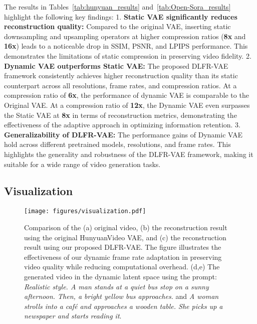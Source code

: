 The results in Tables~\ref{tab:hunyuan_results} and~\ref{tab:Open-Sora_results} highlight the following key findings: 1. \textbf{Static VAE significantly reduces reconstruction quality:} Compared to the original VAE, inserting static downsampling and upsampling operators at higher compression ratios (\textbf{8x} and \textbf{16x}) leads to a noticeable drop in SSIM, PSNR, and LPIPS performance. This demonstrates the limitations of static compression in preserving video fidelity. 2. \textbf{Dynamic VAE outperforms Static VAE:} The proposed DLFR-VAE framework consistently achieves higher reconstruction quality than its static counterpart across all resolutions, frame rates, and compression ratios. 
At a compression ratio of \textbf{6x}, the performance of dynamic VAE is comparable to the Original VAE. At a compression ratio of \textbf{12x}, the Dynamic VAE even surpasses the Static VAE at \textbf{8x} in terms of reconstruction metrics, demonstrating the effectiveness of the adaptive approach in optimizing information retention. 3. \textbf{Generalizability of DLFR-VAE:} The performance gains of Dynamic VAE hold across different pretrained models, resolutions, and frame rates. This highlights the generality and robustness of the DLFR-VAE framework, making it suitable for a wide range of video generation tasks.

\subsection{Visualization}

\begin{figure*}[!tb] %
    \centering
    \texttt{[image: figures/visualization.pdf]} %
    \caption{Comparison of the (a) original video, (b) the reconstruction result using the original HunyuanVideo VAE, and (c) the reconstruction result using our proposed DLFR-VAE. The figure illustrates the effectiveness of our dynamic frame rate adaptation in preserving video quality while reducing computational overhead. (d,e) The generated video in the dynamic latent space using the prompt: \textit{Realistic style. A man stands at a quiet bus stop on a sunny afternoon. Then, a bright yellow bus approaches.} and \textit{A woman strolls into a café and approaches a wooden table. She picks up a newspaper and starts reading it}.}
    \label{im_visualization}
\vspace{-0.2in}
\end{figure*}

